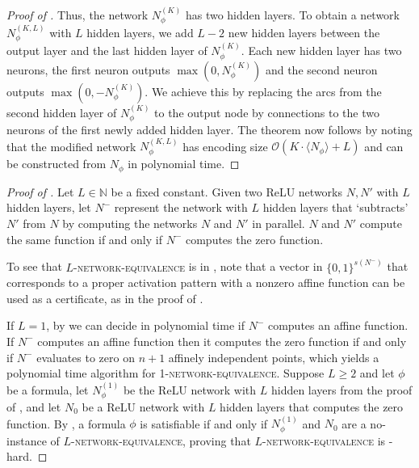 \documentclass{article}
\begin{document}
\begin{proof}[Proof of ]
Thus, the network $N^{(K)}_\phi$ has two hidden layers.
To obtain a network $N^{(K,L)}_\phi$ with $L$ hidden layers, we add $L-2$ new hidden layers between the output layer and the last hidden layer of $N^{(K)}_\phi$.
Each new hidden layer has two neurons, the first neuron outputs $\max(0, N^{(K)}_\phi)$ and the second neuron outputs $\max(0, -N^{(K)}_\phi)$.
We achieve this by replacing the arcs from the second hidden layer of $N^{(K)}_\phi$ to the output node by connections to the two neurons of the first newly added hidden layer.
The theorem now follows by noting that the modified network $N^{(K,L)}_\phi$ has encoding size $\mathcal{O}(K\cdot\langle N_\phi\rangle+L)$ and can be constructed from $N_\phi$ in polynomial time.
\end{proof}
\begin{proof}[Proof of ]
    Let $L\in \mathbb{N}$ be a fixed constant.
    Given two ReLU networks $N, N'$ with $L$ hidden layers, let $N^-$ represent the network with $L$ hidden layers that `subtracts' $N'$ from $N$ by computing the networks $N$ and $N'$ in parallel. $N$ and $N'$ compute the same function if and only if $N^-$ computes the zero function.

    To see that \textsc{$L$-network-equivalence} is in \NP, note that a vector in $\{0,1\}^{s(N^-)}$ that corresponds to a proper activation pattern with a nonzero affine function can be used as a certificate, as in the proof of .

    If $L=1$, by  we can decide in polynomial time if $N^-$ computes an affine function.
    If $N^-$ computes an affine function then it computes the zero function if and only if $N^-$ evaluates to zero on $n+1$ affinely independent points, which yields a polynomial time algorithm for \textsc{1-network-equivalence}.
    Suppose $L\geq 2$ and let $\phi$ be a \SAT{} formula, let $N^{(1)}_\phi$ be the ReLU network with $L$ hidden layers from the proof of , and let $N_0$ be a ReLU network with $L$ hidden layers that computes the zero function.
    By , a \SAT{} formula $\phi$ is satisfiable if and only if $N^{(1)}_\phi$ and $N_0$ are a no-instance of \textsc{$L$-network-equivalence}, proving that \textsc{$L$-network-equivalence} is \coNP-hard.
\end{proof}
\end{document}
